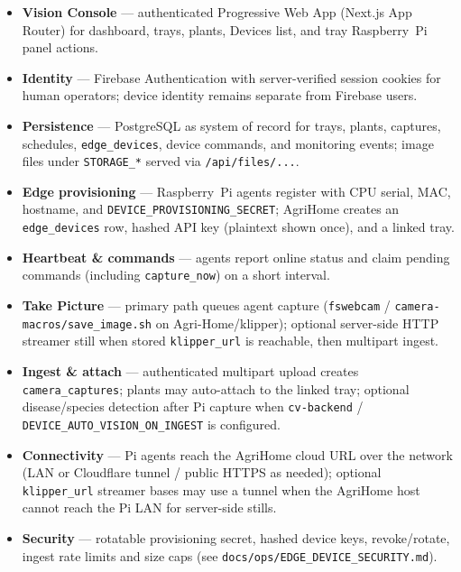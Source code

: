\documentclass[11pt,letterpaper]{article}
\begin{document}
\begin{itemize}
  \item \textbf{Vision Console} --- authenticated Progressive Web App (Next.js App Router) for
        dashboard, trays, plants, Devices list, and tray Raspberry~Pi panel actions.
  \item \textbf{Identity} --- Firebase Authentication with server-verified session cookies for human
        operators; device identity remains separate from Firebase users.
  \item \textbf{Persistence} --- PostgreSQL as system of record for trays, plants, captures, schedules,
        \texttt{edge\_devices}, device commands, and monitoring events; image files under
        \texttt{STORAGE\_*} served via \texttt{/api/files/...}.
  \item \textbf{Edge provisioning} --- Raspberry~Pi agents register with CPU serial, MAC, hostname,
        and \texttt{DEVICE\_PROVISIONING\_SECRET}; AgriHome creates an \texttt{edge\_devices} row,
        hashed API key (plaintext shown once), and a linked tray.
  \item \textbf{Heartbeat \& commands} --- agents report online status and claim pending commands
        (including \texttt{capture\_now}) on a short interval.
  \item \textbf{Take Picture} --- primary path queues agent capture (\texttt{fswebcam} /
        \texttt{camera-macros/save\_image.sh} on Agri-Home/klipper); optional server-side HTTP
        streamer still when stored \texttt{klipper\_url} is reachable, then multipart ingest.
  \item \textbf{Ingest \& attach} --- authenticated multipart upload creates \texttt{camera\_captures};
        plants may auto-attach to the linked tray; optional disease/species detection after Pi capture
        when \texttt{cv-backend} / \texttt{DEVICE\_AUTO\_VISION\_ON\_INGEST} is configured.
  \item \textbf{Connectivity} --- Pi agents reach the AgriHome cloud URL over the network (LAN or
        Cloudflare tunnel / public HTTPS as needed); optional \texttt{klipper\_url} streamer bases may
        use a tunnel when the AgriHome host cannot reach the Pi LAN for server-side stills.
  \item \textbf{Security} --- rotatable provisioning secret, hashed device keys, revoke/rotate, ingest
        rate limits and size caps (see \texttt{docs/ops/EDGE\_DEVICE\_SECURITY.md}).
\end{itemize}
\end{document}
